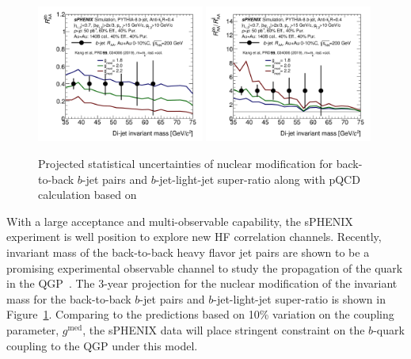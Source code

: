 \begin{figure}[htbp]
\centering
\includegraphics[width=0.49\textwidth]{figs/200pp_pythia8_CTEQ6L_7GeV_ALL_cfg_eneg_DSTReader_root_Draw_HFJetTruth_InvMass_CrossSection2RAA_Theory_3yr_deta0_70.pdf}
\includegraphics[width=0.49\textwidth]{figs/200pp_pythia8_CTEQ6L_7GeV_ALL_cfg_eneg_DSTReader_root_Draw_HFJetTruth_InvMass_CrossSection2RAARatio_Theory_3yr_deta0_70.pdf}
\caption{Projected statistical uncertainties of nuclear modification for back-to-back $b$-jet pairs and $b$-jet-light-jet super-ratio along with pQCD calculation based on~\cite{Kang:2018wrs}
}
\label{fig:HF-bjet-pair}
\end{figure}

With a large acceptance and multi-observable capability, the sPHENIX experiment is well position to explore new HF correlation channels. Recently, invariant mass of the back-to-back heavy flavor jet pairs are shown to be a promising experimental observable channel to study the propagation of the quark in the QGP~\cite{Kang:2018wrs}. The 3-year projection for the nuclear modification of the invariant mass for the back-to-back $b$-jet pairs and $b$-jet-light-jet super-ratio is shown in Figure~\ref{fig:HF-bjet-pair}. Comparing to the predictions based on 10\% variation on the coupling parameter, $g^{\textrm{med}}$, the sPHENIX data will place stringent constraint on the $b$-quark coupling to the QGP under this model. 



